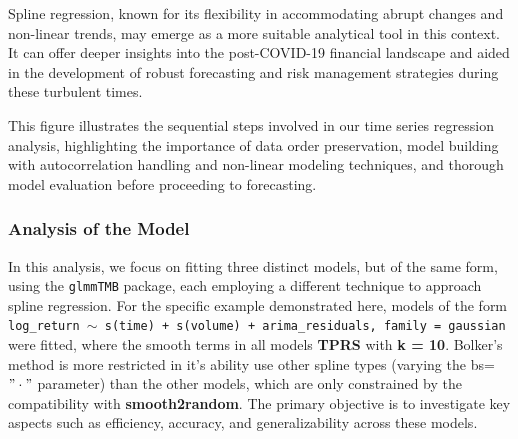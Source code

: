 \documentclass[12pt, twoside,hidelinks]{article}
\theoremstyle{definition}
\numberwithin{equation}{section}
\begin{document}
Spline regression, known for its flexibility in accommodating abrupt changes and non-linear trends, may emerge as a more suitable analytical tool in this context. It can offer deeper insights into the post-COVID-19 financial landscape and aided in the development of robust forecasting and risk management strategies during these turbulent times.
\newline

\begin{center}
\end{center}

This figure illustrates the sequential steps involved in our time series regression analysis, highlighting the importance of data order preservation, model building with autocorrelation handling and non-linear modeling techniques, and thorough model evaluation before proceeding to forecasting.



\subsubsection{Analysis of the Model}

In this analysis, we focus on fitting three distinct models, but of the same form, using the \texttt{glmmTMB} package, each employing a different technique to approach spline regression. For the specific example demonstrated here, models of the form \texttt{log\_return $\sim$ s(time) + s(volume) + arima\_residuals, family = gaussian} were fitted, where the smooth terms in all models \textbf{TPRS} with \textbf{k = 10}. Bolker's method is more restricted in it's ability use other spline types (varying the bs=$"\cdot"$ parameter) than the other models, which are only constrained by the compatibility with \textbf{smooth2random}. The primary objective is to investigate key aspects such as efficiency, accuracy, and generalizability across these models.
\newline
\end{document}
